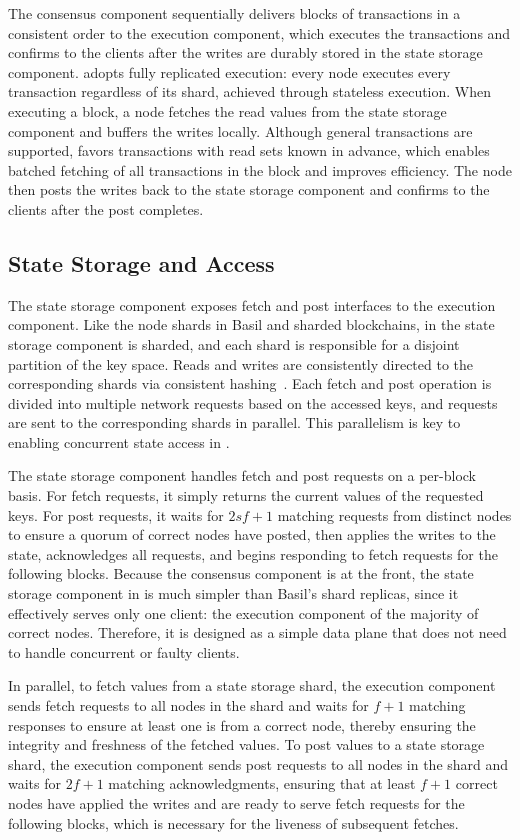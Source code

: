 The consensus component sequentially delivers blocks of transactions in a consistent order to the execution component, which executes the transactions and confirms to the clients after the writes are durably stored in the state storage component.
\sys adopts fully replicated execution: every node executes every transaction regardless of its shard, achieved through stateless execution.
When executing a block, a node fetches the read values from the state storage component and buffers the writes locally.
Although general transactions are supported, \sys favors transactions with read sets known in advance, which enables batched fetching of all transactions in the block and improves efficiency.
The node then posts the writes back to the state storage component and confirms to the clients after the post completes.

\subsection{State Storage and Access}

The state storage component exposes fetch and post interfaces to the execution component.
Like the node shards in Basil and sharded blockchains, in \sys the state storage component is sharded, and each shard is responsible for a disjoint partition of the key space.
Reads and writes are consistently directed to the corresponding shards via consistent hashing~\cite{karger1997consistent}.
Each fetch and post operation is divided into multiple network requests based on the accessed keys, and requests are sent to the corresponding shards in parallel.
This parallelism is key to enabling concurrent state access in \sys.

The state storage component handles fetch and post requests on a per-block basis.
For fetch requests, it simply returns the current values of the requested keys.
For post requests, it waits for $2sf+1$ matching requests from distinct nodes to ensure a quorum of correct nodes have posted, then applies the writes to the state, acknowledges all requests, and begins responding to fetch requests for the following blocks.
Because the consensus component is at the front, the state storage component in \sys is much simpler than Basil's shard replicas, since it effectively serves only one client: the execution component of the majority of correct nodes.
Therefore, it is designed as a simple data plane that does not need to handle concurrent or faulty clients.

In parallel, to fetch values from a state storage shard, the execution component sends fetch requests to all nodes in the shard and waits for $f+1$ matching responses to ensure at least one is from a correct node, thereby ensuring the integrity and freshness of the fetched values.
To post values to a state storage shard, the execution component sends post requests to all nodes in the shard and waits for $2f+1$ matching acknowledgments, ensuring that at least $f+1$ correct nodes have applied the writes and are ready to serve fetch requests for the following blocks, which is necessary for the liveness of subsequent fetches.

